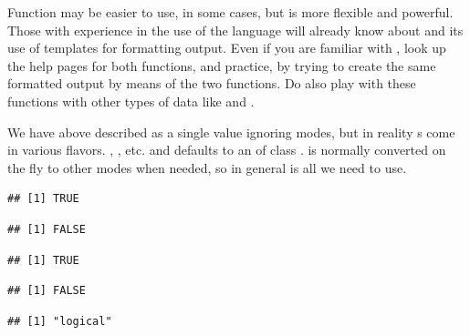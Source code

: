 \documentclass[krantz2]{krantz}\usepackage{knitr}
\begin{document}
\begin{playground}
Function  may be easier to use, in some cases, but  is more flexible and powerful. Those with experience in the use of the \Clang language will already know about  and its use of templates for formatting output. Even if you are familiar with  \Clang, look up the help pages for both functions, and practice, by trying to create the same formatted output by means of the two functions. Do also play with these functions with other types of data like  and .
\end{playground}

\begin{explainbox}
We have above described  as a single value ignoring modes, but in reality s come in various flavors. , , etc. and  defaults to an  of class .  is normally converted on the fly to other modes when needed, so in general  is all we need to use.

\begin{knitrout}\footnotesize
{}\color{fgcolor}\begin{kframe}
\begin{alltt}
 \hlkwb{<-} \hlstd{(}\hlstd{,} \hlstd{)}
\hlstd{(a[}\hlstd{])}
\end{alltt}
\begin{verbatim}
## [1] TRUE
\end{verbatim}
\begin{alltt}
\hlstd{(}\hlstd{)}
\end{alltt}
\begin{verbatim}
## [1] FALSE
\end{verbatim}
\begin{alltt}
 \hlkwb{<-} \hlstd{(}\hlstd{,} \hlstd{)}
\hlstd{(b[}\hlstd{])}
\end{alltt}
\begin{verbatim}
## [1] TRUE
\end{verbatim}
\begin{alltt}
\hlstd{(}\hlstd{)}
\end{alltt}
\begin{verbatim}
## [1] FALSE
\end{verbatim}
\begin{alltt}
\hlstd{(}\hlstd{)}
\end{alltt}
\begin{verbatim}
## [1] "logical"
\end{verbatim}
\end{kframe}
\end{knitrout}


\end{explainbox}
\end{document}
